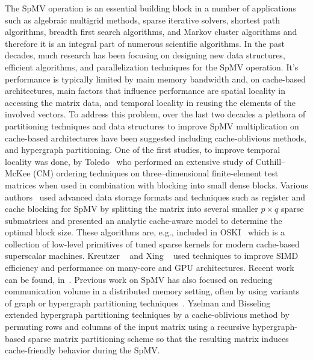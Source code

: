 The \Acrshort{SpMV} operation is an essential building block 
in a number of applications such as algebraic multigrid methods, 
sparse iterative solvers, shortest path algorithms, breadth first search algorithms, 
and Markov cluster algorithms and therefore it is an integral part 
of numerous scientific algorithms.
In the past decades, much research has been
focusing on designing new data structures, efficient algorithms, and
parallelization  techniques for the \acrshort{SpMV} operation. It's performance is typically limited by main memory bandwidth and, on
cache-based architectures, main factors that influence performance
are spatial locality in accessing the matrix data, and temporal locality in
reusing the elements of the involved vectors. To address this problem, over the
last two decades a plethora of  partitioning techniques
and data structures to improve \acrshort{SpMV} multiplication on cache-based
architectures have been suggested including %
cache-oblivious methods, and hypergraph partitioning. One
of the first studies, \eg to improve temporal locality was done, \eg
by Toledo~\cite{Toledo:1997:IMP:279511.279532} who performed an
extensive study of Cuthill--McKee (CM) ordering
techniques on three--dimensional finite-element test matrices when
used in combination with blocking into small dense blocks. Various
authors~\cite{Williams:2009:OSM:1513001.1513318,doi:10.1177/1094342004041296}
used advanced data storage formats and techniques such as register and cache blocking  for  
\acrshort{SpMV} by splitting the matrix into several smaller $p \times
q$ sparse submatrices and presented an analytic cache-aware model to
determine the optimal block size. These algorithms are, e.g.,
included in OSKI~\cite{1742-6596-16-1-071} which is a collection of
low-level primitives of tuned sparse kernels for modern cache-based
superscalar machines. Kreutzer \etal~\cite{Moritz_sell} and 
Xing \etal~\cite{Liu:2013:ESM:2464996.2465013} used techniques to 
improve SIMD efficiency and performance on many-core and GPU architectures. 
Recent work can be found, \eg
in~\cite{li2017hbm,Liu:2015:CES:2751205.2751209,liu2015spmv}.
 Previous work on  \acrshort{SpMV}  has also focused on reducing
 communication volume in a distributed memory setting, often by using
 variants of graph or hypergraph partitioning
 techniques~\cite{Catalyurek:1999}. Yzelman and
 Bisseling~\cite{doi:10.1137/080733243,Yzelman-thesis-2011} extended
 hypergraph partitioning techniques by a cache-oblivious method by
 permuting rows and columns of the input matrix using a recursive
 hypergraph-based sparse matrix partitioning scheme so that the
 resulting matrix induces cache-friendly behavior during the
 \acrshort{SpMV}.

